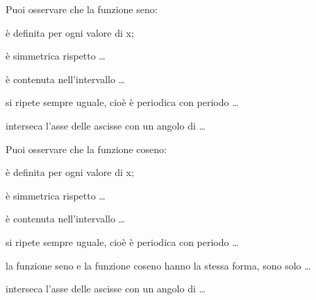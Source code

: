  \vspace{-6pt}
  \begin{center}
\begin{inaccessibleblock}
    
\end{inaccessibleblock}
  \end{center}
Puoi osservare che la funzione seno:
\begin{itemize*}
 \item è definita per ogni valore di x;
 \item è simmetrica rispetto \dots
 \item è contenuta nell'intervallo \dots
 \item si ripete sempre uguale, cioè è periodica con periodo \dots
 \item interseca l'asse delle ascisse con un angolo di \dots
\end{itemize*}
 \vspace{-6pt}
  \begin{center}
  
\begin{inaccessibleblock}
    
\end{inaccessibleblock}
  \end{center}
Puoi osservare che la funzione coseno:
\begin{itemize*}
 \item è definita per ogni valore di x;
 \item è simmetrica rispetto \dots
 \item è contenuta nell'intervallo \dots
 \item si ripete sempre uguale, cioè è periodica con periodo \dots
 \item la funzione seno e la funzione coseno hanno la stessa forma,
  sono solo \dots
 \item interseca l'asse delle ascisse con un angolo di \dots
\end{itemize*}

